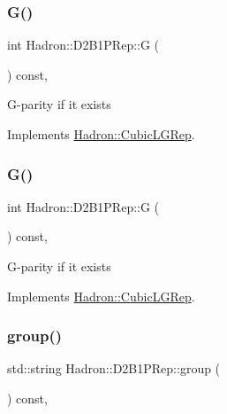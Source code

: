 \subsubsection{\texorpdfstring{G()}{G()}\hspace{0.1cm}{\footnotesize\ttfamily [2/3]}}
{\footnotesize\ttfamily int Hadron\+::\+D2\+B1\+P\+Rep\+::G (\begin{DoxyParamCaption}{ }\end{DoxyParamCaption}) const\hspace{0.3cm}{\ttfamily [inline]}, {\ttfamily [virtual]}}

G-\/parity if it exists 

Implements \mbox{\hyperlink{structHadron_1_1CubicLGRep_ace26f7b2d55e3a668a14cb9026da5231}{Hadron\+::\+Cubic\+L\+G\+Rep}}.

\mbox{\label{structHadron_1_1D2B1PRep_aedd87d6bd49194a47e13d78217e863c5}} 
\subsubsection{\texorpdfstring{G()}{G()}\hspace{0.1cm}{\footnotesize\ttfamily [3/3]}}
{\footnotesize\ttfamily int Hadron\+::\+D2\+B1\+P\+Rep\+::G (\begin{DoxyParamCaption}{ }\end{DoxyParamCaption}) const\hspace{0.3cm}{\ttfamily [inline]}, {\ttfamily [virtual]}}

G-\/parity if it exists 

Implements \mbox{\hyperlink{structHadron_1_1CubicLGRep_ace26f7b2d55e3a668a14cb9026da5231}{Hadron\+::\+Cubic\+L\+G\+Rep}}.

\mbox{\label{structHadron_1_1D2B1PRep_ac5e1e2dc68a975d7263f783bbc7f4658}} 
\subsubsection{\texorpdfstring{group()}{group()}\hspace{0.1cm}{\footnotesize\ttfamily [1/3]}}
{\footnotesize\ttfamily std\+::string Hadron\+::\+D2\+B1\+P\+Rep\+::group (\begin{DoxyParamCaption}{ }\end{DoxyParamCaption}) const\hspace{0.3cm}{\ttfamily [inline]}, {\ttfamily [virtual]}}


